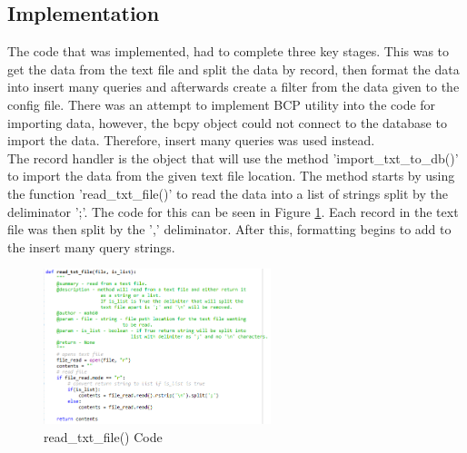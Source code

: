 \documentclass{report}
\begin{document}
\subsection{Implementation}
The code that was implemented, had to complete three key stages. This was to get the data from the text file and split the data by record, then format the data into insert many queries and afterwards create a filter from the data given to the config file. There was an attempt to implement BCP utility into the code for importing data, however, the bcpy object\cite{bcpy} could not connect to the database to import the data. Therefore, insert many queries was used instead. \\ \newline
The record handler is the object that will use the method 'import\_txt\_to\_db()' to import the data from the given text file location. The method starts by using the function 'read\_txt\_file()' to read the data into a list of strings split by the deliminator ';'. The code for this can be seen in Figure \ref{fig:read_Text_file}. Each record in the text file was then split by the ',' deliminator. After this, formatting begins to add to the insert many query strings. \\ \newline
\begin{figure}[h!]
    \centering
    \includegraphics[width=250]{readTxtFile.PNG}
    \caption{read\_txt\_file() Code}
    \label{fig:read_Text_file}
\end{figure} \\
\end{document}
